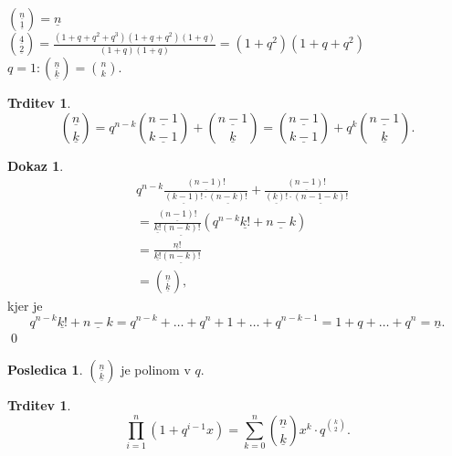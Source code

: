 \documentclass[a4paper, 12pt]{book}
\theoremstyle{definition}
\newtheorem{conseq}[counter]{Posledica}
\newtheorem{claim}[counter]{Trditev}
\newtheorem{pro}[counter]{Dokaz}
\theoremstyle{remark}
\begin{document}
$\binom{\underline{n}}{\underline{1}} = \underline{n}$ \\
$\binom{\underline{4}}{\underline{2}} = \frac{(1 + q + q^2 + q^3)(1 + q + q^2) (1 + q)}{(1 + q)(1 + q)} =
(1 + q^2) (1 + q + q^2)$ \\
$q = 1: \binom{\underline{n}}{\underline{k}} = \binom{n}{k}$.
\begin{claim}
  \begin{equation*}
    \binom{\underline{n}}{\underline{k}}
    = q^{n-k} \binom{\underline{n-1}}{\underline{k-1}} + \binom{\underline{n-1}}{\underline{k}}
    = \binom{\underline{n-1}}{\underline{k-1}} + q^k \binom{\underline{n-1}}{\underline{k}}.
  \end{equation*}
\end{claim}
\begin{pro}
  \begin{align*}
    &q^{n-k} \frac{\underline{(n-1)!}}{\underline{(k-1)!} \cdot \underline{(n-k)!}} +
      \frac{\underline{(n-1)!}}{\underline{(k)!} \cdot \underline{(n-1-k)!}} \\
    &= \frac{\underline{(n-1)!}}{\underline{k!} \underline{(n-k)!}} (q^{n-k} \underline{k!} + \underline{n-k}) \\
    &= \frac{\underline{n!}}{\underline{k!} \underline{(n-k)!}} \\
    &= \binom{\underline{n}}{\underline{k}},
  \end{align*}
  kjer je
  \begin{equation*}
    q^{n-k} \underline{k!} + \underline{n-k} = q^{n-k} + \dots + q^n + 1 + \dots + q^{n-k-1} = 1 + q + \dots + q^n
    = \underline{n}.
  \end{equation*}
  \qed
\end{pro}
\begin{conseq}
  $\binom{\underline{n}}{\underline{k}}$ je polinom v $q$.
\end{conseq}
\begin{claim}
  \begin{equation*}
    \prod_{i=1}^{n} (1 + q^{i-1}x) = \sum_{k=0}^{n} \binom{\underline{n}}{\underline{k}} x^k \cdot q^{\binom{k}{2}}.
  \end{equation*}
\end{claim}
\end{document}
